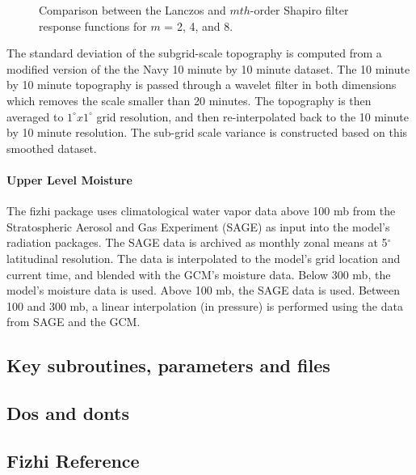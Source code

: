 \begin{figure*}[htbp]
  \centerline{  \epsfysize=7.0in  }
  \caption{ \label{fig:fizhi:lanczos} Comparison between the Lanczos and $mth$-order Shapiro filter 
  response functions for $m$ = 2, 4, and 8. }
\end{figure*}

The standard deviation of the subgrid-scale topography
is computed from a modified version of the the Navy 10 minute by 10 minute dataset.
The 10 minute by 10 minute topography is passed through a wavelet
filter in both dimensions which removes the scale smaller than 20 minutes.
The topography is then averaged to $1^\circ x 1^\circ$ grid resolution, and then
re-interpolated back to the 10 minute by 10 minute resolution. 
The sub-grid scale variance is constructed based on this smoothed dataset.


\paragraph{Upper Level Moisture}
The fizhi package uses climatological water vapor data above 100 mb from the Stratospheric Aerosol and Gas 
Experiment (SAGE) as input into the model's radiation packages.  The SAGE data is archived
as monthly zonal means at 5$^\circ$ latitudinal resolution.  The data is interpolated to the
model's grid location and current time, and blended with the GCM's moisture data.  Below 300 mb,
the model's moisture data is used.  Above 100 mb, the SAGE data is used.  Between 100 and 300 mb,
a linear interpolation (in pressure) is performed using the data from SAGE and the GCM. 

\subsection{Key subroutines, parameters and files}

\subsection{Dos and donts}

\subsection{Fizhi Reference}
